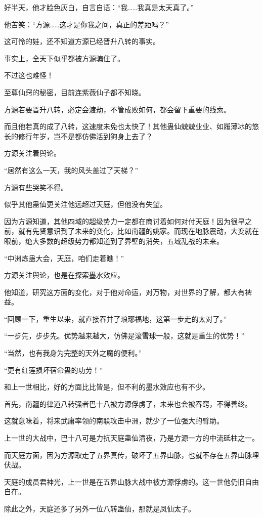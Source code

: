 \begin{this_body}
好半天，他才脸色灰白，自言自语：“我……我真是太天真了。”

他苦笑：“方源……这才是你我之间，真正的差距吗？”

这可怜的娃，还不知道方源已经晋升八转的事实。

事实上，全天下似乎都被方源骗住了。

不过这也难怪！

至尊仙窍的秘密，目前连紫薇仙子都不知晓。

方源若要晋升八转，必定会渡劫，不管成败如何，都会留下重要的线索。

而且他若真的成了八转，这速度未免也太快了！其他蛊仙兢兢业业、如履薄冰的悠长的修行年岁，岂不是都仿佛活到狗身上去了？

方源关注着舆论。

“居然有这么一天，我的风头盖过了天梯？”

方源有些哭笑不得。

似乎其他蛊仙更关注他远超过天庭，但他没有失望。

因为方源知道，其他四域的超级势力一定都在商讨着如何对付天庭！因为很早之前，就有先贤意识到了未来的变化，比如南疆的姚家。而现在地脉震动，大变就在眼前，绝大多数的超级势力都知道到了界壁的消失，五域乱战的未来。

“中洲炼蛊大会，天庭，咱们走着瞧！”

方源关注舆论，也是在探索墨水效应。

他知道，研究这方面的变化，对于他对命运，对万物，对世界的了解，都大有裨益。

“回顾一下，重生以来，就直接吞并了琅琊福地，这第一步走的太对了。”

“一步先，步步先。优势越来越大，仿佛是滚雪球一般，这就是重生的优势！”

“当然，也有我身为完整的天外之魔的便利。”

“更有红莲损坏宿命蛊的功劳！”

和上一世相比，好的方面比比皆是，但不利的墨水效应也有不少。

首先，南疆的律道八转强者巴十八被方源俘虏了，未来也会被吞窍，不得善终。

这就意味着，将来武庸率领的南联攻击中洲，就少了一位强大的臂助。

上一世的大战中，巴十八可是力抗天庭蛊仙清夜，乃是方源一方的中流砥柱之一。

而天庭方面，因为方源取走了五界真传，破坏了五界山脉，也就不存在五界山脉埋伏战。

天庭的成员君神光，上一世是在五界山脉大战中被方源俘虏的。这一世他仍旧自由自在。

除此之外，天庭还多了另外一位八转蛊仙，那就是凤仙太子。


\end{this_body}
